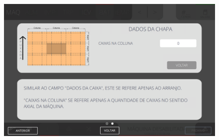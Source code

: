 \newpage
\thispagestyle{fancy}
\vspace{\fill}
\begin{figure}
    \centering
    \includegraphics[width=576 px,height=360 px]{src/imagesICV/07-scout/settings/e-7.png}
\end{figure}
